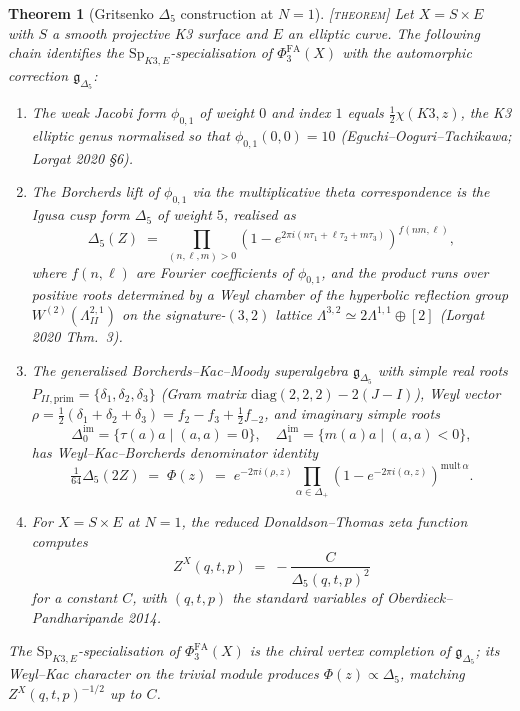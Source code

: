 \documentclass[11pt]{amsart}
\providecommand{\gDelta}{\mathfrak{g}_{\Delta_5}}
\providecommand{\Sp}{\mathrm{Sp}}
\providecommand{\PhiFA}{\Phi^{\mathrm{FA}}}
\providecommand{\ClaimStatusTheorem}{\textsc{[theorem]}}
\theoremstyle{plain}
\newtheorem{theorem}{Theorem}[section]
\theoremstyle{definition}
\theoremstyle{remark}
\begin{document}
\begin{theorem}[Gritsenko $\Delta_5$ construction at $N=1$]
\label{thm:delta5-N1}
\ClaimStatusTheorem{}\;
Let $X=S\times E$ with $S$ a smooth projective K3 surface and $E$ an
elliptic curve. The following chain identifies the
$\Sp_{K3,E}$-specialisation of $\PhiFA_3(X)$ with the automorphic
correction $\gDelta$:
\begin{enumerate}
\item The weak Jacobi form $\phi_{0,1}$ of weight $0$ and index $1$
equals $\frac{1}{2}\chi(K3,z)$, the K3 elliptic genus normalised so
that $\phi_{0,1}(0,0)=10$ (Eguchi--Ooguri--Tachikawa; Lorgat 2020 \S6).
\item The Borcherds lift of $\phi_{0,1}$ via the multiplicative
theta correspondence is the Igusa cusp form $\Delta_5$ of weight $5$,
realised as
\[
\Delta_5(Z)\;=\;
\prod_{(n,\ell,m)>0}(1-e^{2\pi i(n\tau_1+\ell\tau_2+m\tau_3)})^{f(nm,\ell)},
\]
where $f(n,\ell)$ are Fourier coefficients of $\phi_{0,1}$, and the
product runs over positive roots determined by a Weyl chamber of the
hyperbolic reflection group $W^{(2)}(\Lambda^{2,1}_{II})$ on the
signature-$(3,2)$ lattice $\Lambda^{3,2}\simeq 2\Lambda^{1,1}\oplus[2]$
(Lorgat 2020 Thm.~3).
\item The generalised Borcherds--Kac--Moody superalgebra $\gDelta$
with simple real roots $P_{II,\mathrm{prim}}=\{\delta_1,\delta_2,\delta_3\}$
(Gram matrix $\mathrm{diag}(2,2,2)-2(J-I)$), Weyl vector
$\rho=\tfrac12(\delta_1+\delta_2+\delta_3)=f_2-f_3+\tfrac12 f_{-2}$, and
imaginary simple roots
\[
\Delta^{\mathrm{im}}_0=\{\tau(a)a\mid (a,a)=0\},\quad
\Delta^{\mathrm{im}}_1=\{m(a)a\mid (a,a)<0\},
\]
has Weyl--Kac--Borcherds denominator identity
\[
\tfrac1{64}\Delta_5(2Z)\;=\;\Phi(z)\;=\;e^{-2\pi i(\rho,z)}
\prod_{\alpha\in\Delta_+}(1-e^{-2\pi i(\alpha,z)})^{\mathrm{mult}\,\alpha}.
\]
\item For $X=S\times E$ at $N=1$, the reduced Donaldson--Thomas zeta
function computes
\[
Z^X(q,t,p)\;=\;-\frac{C}{\Delta_5(q,t,p)^2}
\]
for a constant $C$, with $(q,t,p)$ the standard variables of
Oberdieck--Pandharipande 2014.
\end{enumerate}
The $\Sp_{K3,E}$-specialisation of $\PhiFA_3(X)$ is the chiral vertex
completion of $\gDelta$; its Weyl--Kac character on the trivial module
produces $\Phi(z)\propto \Delta_5$, matching $Z^X(q,t,p)^{-1/2}$ up
to $C$.
\end{theorem}
\end{document}
